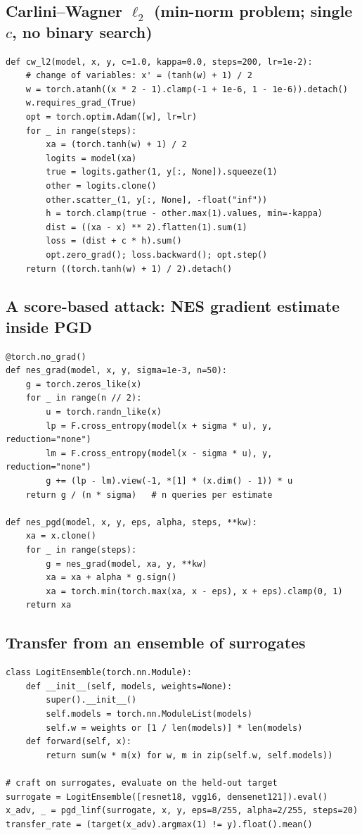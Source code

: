 \documentclass[10pt,a4paper]{extarticle}
\theoremstyle{definition}
\begin{document}
\subsection{Carlini--Wagner \(\ell_2\) (min-norm problem; single \(c\), no binary search)}

\begin{lstlisting}
def cw_l2(model, x, y, c=1.0, kappa=0.0, steps=200, lr=1e-2):
    # change of variables: x' = (tanh(w) + 1) / 2
    w = torch.atanh((x * 2 - 1).clamp(-1 + 1e-6, 1 - 1e-6)).detach()
    w.requires_grad_(True)
    opt = torch.optim.Adam([w], lr=lr)
    for _ in range(steps):
        xa = (torch.tanh(w) + 1) / 2
        logits = model(xa)
        true = logits.gather(1, y[:, None]).squeeze(1)
        other = logits.clone()
        other.scatter_(1, y[:, None], -float("inf"))
        h = torch.clamp(true - other.max(1).values, min=-kappa)
        dist = ((xa - x) ** 2).flatten(1).sum(1)
        loss = (dist + c * h).sum()
        opt.zero_grad(); loss.backward(); opt.step()
    return ((torch.tanh(w) + 1) / 2).detach()
\end{lstlisting}

\subsection{A score-based attack: NES gradient estimate inside PGD}

\begin{lstlisting}
@torch.no_grad()
def nes_grad(model, x, y, sigma=1e-3, n=50):
    g = torch.zeros_like(x)
    for _ in range(n // 2):
        u = torch.randn_like(x)
        lp = F.cross_entropy(model(x + sigma * u), y, reduction="none")
        lm = F.cross_entropy(model(x - sigma * u), y, reduction="none")
        g += (lp - lm).view(-1, *[1] * (x.dim() - 1)) * u
    return g / (n * sigma)   # n queries per estimate

def nes_pgd(model, x, y, eps, alpha, steps, **kw):
    xa = x.clone()
    for _ in range(steps):
        g = nes_grad(model, xa, y, **kw)
        xa = xa + alpha * g.sign()
        xa = torch.min(torch.max(xa, x - eps), x + eps).clamp(0, 1)
    return xa
\end{lstlisting}

\subsection{Transfer from an ensemble of surrogates}

\begin{lstlisting}
class LogitEnsemble(torch.nn.Module):
    def __init__(self, models, weights=None):
        super().__init__()
        self.models = torch.nn.ModuleList(models)
        self.w = weights or [1 / len(models)] * len(models)
    def forward(self, x):
        return sum(w * m(x) for w, m in zip(self.w, self.models))

# craft on surrogates, evaluate on the held-out target
surrogate = LogitEnsemble([resnet18, vgg16, densenet121]).eval()
x_adv, _ = pgd_linf(surrogate, x, y, eps=8/255, alpha=2/255, steps=20)
transfer_rate = (target(x_adv).argmax(1) != y).float().mean()
\end{lstlisting}
\end{document}

